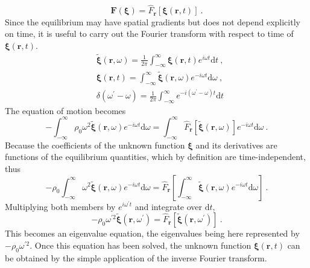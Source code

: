 \documentclass[12pt,a4paper]{article}
\renewcommand{\vec}[1]{\boldsymbol{#1}}
\newcommand{\dif}{\mathrm{d}}
\begin{document}
\begin{equation*}
\vec{F}(\vec{\xi}) = \hat{F}_{\vec{r}}[\vec{\xi}(\vec{r}, t)] ~.
\end{equation*}
Since the equilibrium may have spatial gradients but does not depend explicitly on time, it is useful to carry out the Fourier transform with respect to time of $\vec{\xi}(\vec{r}, t)$.
\begin{align}
& \tilde{\vec{\xi}}(\vec{r}, \omega) = \frac{1}{2\pi} \int_{-\infty}^\infty \vec{\xi}(\vec{r}, t) e^{i\omega t} \dif t ~, \\
& \vec{\xi}(\vec{r}, t) = \int_{-\infty}^\infty \tilde{\vec{\xi}}(\vec{r}, \omega)  e^{-i\omega t} \dif \omega ~, \\
& \delta(\omega^\prime -\omega) = \frac{1}{2\pi} \int_{-\infty}^\infty e^{-i(\omega^\prime-\omega) t} \dif t 
\end{align}
The equation of motion becomes
\begin{equation*}
-\int_{-\infty}^\infty \rho_0 \omega^2 \tilde{\vec{\xi}}(\vec{r}, \omega) e^{-i\omega t} \dif \omega = \int_{-\infty}^\infty \hat{F}_{\vec{r}}[\tilde{\vec{\xi}}(\vec{r}, \omega)] e^{-i\omega t} \dif \omega ~.
\end{equation*}
Because the coefficients of the unknown function $\vec{\xi}$ and its derivatives are functions of the equilibrium quantities, which by definition are time-independent, thus
\begin{equation}
-\rho_0 \int_{-\infty}^\infty \omega^2 \tilde{\vec{\xi}}(\vec{r}, \omega) e^{-i\omega t} \dif \omega = \hat{F}_{\vec{r}}\left[ \int_{-\infty}^\infty \tilde{\vec{\xi}}(\vec{r}, \omega) e^{-i\omega t} \dif \omega \right] ~.
\end{equation}
Multiplying both members by $e^{i\omega^\prime t}$ and integrate over $\dif t$,
\begin{equation}
-\rho_0 \omega^{\prime 2} \tilde{\vec{\xi}}(\vec{r}, \omega^\prime ) = \hat{F}_{\vec{r}}[\tilde{\vec{\xi}}(\vec{r}, \omega^\prime)] ~.
\end{equation}
This becomes an eigenvalue equation, the eigenvalues being here represented by $-\rho_0 \omega^{\prime 2}$. Once this equation has been solved, the unknown function $\vec{\xi}(\vec{r}, t)$ can be obtained by the simple application of the inverse Fourier transform.
\end{document}
